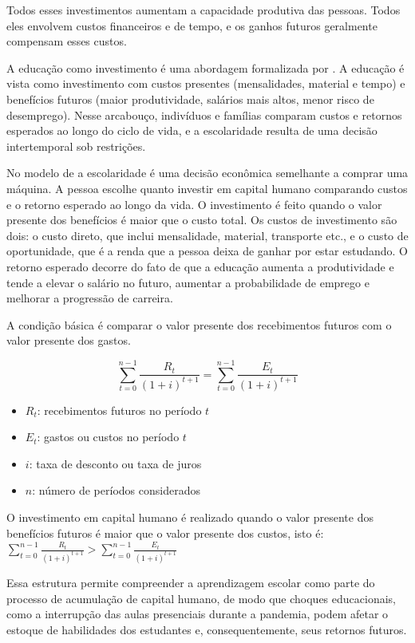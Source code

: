 \documentclass[
	12pt,				%
	openright,			%
	oneside,			%
	a4paper,			%
	brazil,				%
	]{article}
\begin{document}
Todos esses investimentos aumentam a capacidade produtiva das pessoas. Todos
eles envolvem custos financeiros e de tempo, e os ganhos futuros geralmente
compensam esses custos.

A educação como investimento é uma abordagem formalizada por
\textcite{Becker1975_HumanCapital}. A educação é vista como investimento com
custos presentes (mensalidades, material e tempo) e benefícios futuros (maior
produtividade, salários mais altos, menor risco de desemprego). Nesse arcabouço,
indivíduos e famílias comparam custos e retornos esperados ao longo do ciclo de
vida, e a escolaridade resulta de uma decisão intertemporal sob restrições.

No modelo de \textcite{Becker1975_HumanCapital} a escolaridade é uma decisão
econômica semelhante a comprar uma máquina. A pessoa escolhe quanto investir
em capital humano comparando custos e o retorno esperado ao longo da vida.
O investimento é feito quando o valor presente dos benefícios é maior que o
custo total. Os custos de investimento são dois: o custo direto, que inclui
mensalidade, material, transporte etc., e o custo de oportunidade, que é a renda
que a pessoa deixa de ganhar por estar estudando. O retorno esperado decorre do
fato de que a educação aumenta a produtividade e tende a elevar o salário no
futuro, aumentar a probabilidade de emprego e melhorar a progressão de carreira.

A condição básica é comparar o valor presente dos recebimentos futuros com o
valor presente dos gastos.

$$
\sum_{t=0}^{n-1} \frac{R_t}{(1+i)^{t+1}}
=
\sum_{t=0}^{n-1} \frac{E_t}{(1+i)^{t+1}}
$$

\begin{itemize}
  \item $R_t$: recebimentos futuros no período $t$
  \item $E_t$: gastos ou custos no período $t$
  \item $i$: taxa de desconto ou taxa de juros
  \item $n$: número de períodos considerados
\end{itemize}

O investimento em capital humano é realizado quando o valor presente dos
benefícios futuros é maior que o valor presente dos custos, isto é:
$ \sum_{t=0}^{n-1} \frac{R_t}{(1+i)^{t+1}} > \sum_{t=0}^{n-1} \frac{E_t}{(1+i)^{t+1}}$

Essa estrutura permite compreender a aprendizagem escolar como parte do processo
de acumulação de capital humano, de modo que choques educacionais, como a
interrupção das aulas presenciais durante a pandemia, podem afetar o estoque
de habilidades dos estudantes e, consequentemente, seus retornos futuros.
\end{document}
